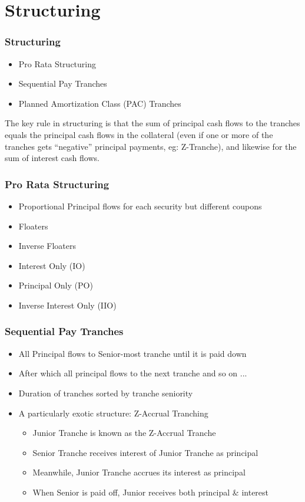\documentclass{beamer}
\begin{document}
\section{Structuring}

\begin{frame}
\frametitle{Structuring}
\begin{itemize}
\item Pro Rata Structuring
\item Sequential Pay Tranches
\item Planned Amortization Class (PAC) Tranches
\end{itemize}
The key rule in structuring is that the sum of principal cash flows to the tranches equals the principal cash flows in the collateral (even if one or more of the tranches gets ``negative'' principal payments, eg: Z-Tranche), and likewise for the sum of interest cash flows.
\end{frame}

\begin{frame}
\frametitle{Pro Rata Structuring}
\begin{itemize}
\item Proportional Principal flows for each security but different coupons 
\item Floaters
\item Inverse Floaters
\item Interest Only (IO)
\item Principal Only (PO)
\item Inverse Interest Only (IIO)
\end{itemize}
\end{frame}

\begin{frame}
\frametitle{Sequential Pay Tranches}
\begin{itemize}
\item All Principal flows to Senior-most tranche until it is paid down
\item After which all principal flows to the next tranche and so on ... 
\item Duration of tranches sorted by tranche seniority
\item A particularly exotic structure: Z-Accrual Tranching
\begin{itemize}
\item Junior Tranche is known as the Z-Accrual Tranche
\item Senior Tranche receives interest of Junior Tranche as principal
\item Meanwhile, Junior Tranche accrues its interest as principal
\item When Senior is paid off, Junior receives both principal \& interest
\end{itemize}
\end{itemize}
\end{frame}
\end{document}
